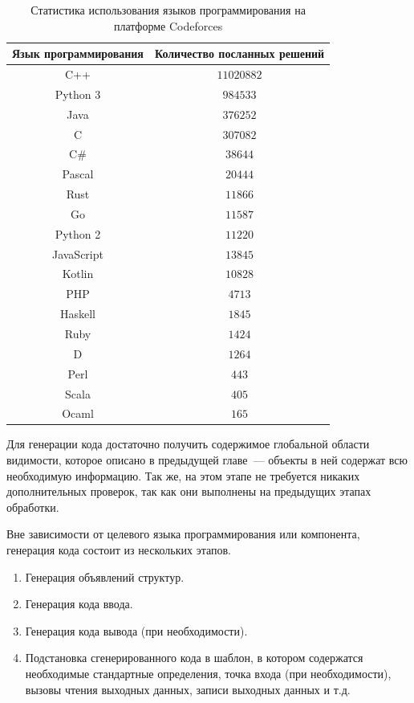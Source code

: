 \documentclass[times,specification,annotation]{style/itmo-student-thesis/itmo-student-thesis}
\begin{document}
\begin{table}[!h]
\caption{Статистика использования языков программирования на платформе Codeforces}\label{codeforces-langs}
\centering
\begin{tabular}{|*{2}{c|}}\hline
Язык программирования & Количество посланных решений \\\hline
C++         &   $11020882$ \\\hline
Python 3    &     $984533$ \\\hline
Java        &     $376252$ \\\hline
C           &     $307082$ \\\hline
C\#         &      $38644$ \\\hline
Pascal      &      $20444$ \\\hline
Rust        &      $11866$ \\\hline
Go          &      $11587$ \\\hline
Python 2    &      $11220$ \\\hline
JavaScript  &      $13845$ \\\hline
Kotlin      &      $10828$ \\\hline
PHP         &       $4713$ \\\hline
Haskell     &       $1845$ \\\hline
Ruby        &       $1424$ \\\hline
D           &       $1264$ \\\hline
Perl        &        $443$ \\\hline
Scala       &        $405$ \\\hline
Ocaml       &        $165$ \\\hline
\end{tabular}
\end{table}

Для генерации кода достаточно получить содержимое глобальной области видимости, которое описано в предыдущей главе~--- объекты в ней содержат всю необходимую информацию. Так же, на этом этапе не требуется никаких дополнительных проверок, так как они выполнены на предыдущих этапах обработки.

Вне зависимости от целевого языка программирования или компонента, генерация кода состоит из нескольких этапов.

\begin{enumerate}[leftmargin=1.75cm]
    \item Генерация объявлений структур.
    \item Генерация кода ввода.
    \item Генерация кода вывода (при необходимости).
    \item Подстановка сгенерированного кода в шаблон, в котором содержатся необходимые стандартные определения, точка входа (при необходимости), вызовы чтения выходных данных, записи выходных данных и т.д.
\end{enumerate}
\end{document}
